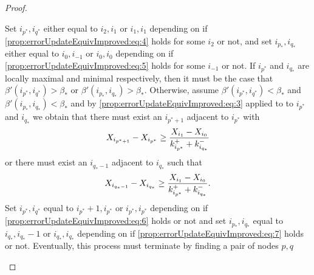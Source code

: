 \documentclass{article}
\theoremstyle{remark}
\begin{document}
\begin{proof}
\begin{enumerate}
			Set $i_{p^*},i_{q^*}$ either equal to $i_2,i_1$ or $i_1,i_1$ depending on if \eqref{prop:errorUpdateEquivImproved:eq:4} holds for some $i_2$ or not, and set $i_{p_*},i_{q_*}$ either equal to $i_0,i_{-1}$ or $i_0,i_0$ depending on if \eqref{prop:errorUpdateEquivImproved:eq:5} holds for some $i_{-1}$ or not. If $i_{p^*}$ and $i_{q_*}$ are locally maximal and minimal respectively, then it must be the case that $\beta'(i_{p^*},i_{q^*})>\beta_*$ or $\beta'(i_{p_*},i_{q_*})>\beta_*$.  Otherwise, assume $\beta'(i_{p^*},i_{q^*})<\beta_*$ and $\beta'(i_{p_*},i_{q_*})<\beta_*$ and by \eqref{prop:errorUpdateEquivImproved:eq:3} applied to to $i_{p^*}$ and $i_{q_*}$ we obtain that there must exist an $i_{p^*+1}$ adjacent to $i_{p^*}$ with
			\begin{equation}{\label{prop:errorUpdateEquivImproved:eq:6}}
				X_{i_{p^*+1}}-X_{i_{p^*}}\geq\frac{X_{i_1}-X_{i_0}}{k^+_{i_{p^*}}+k^-_{i_{q_*}}}
			\end{equation}
			or there must exist an $i_{q_*-1}$ adjacent to $i_{q_*}$ such that
			\begin{equation}{\label{prop:errorUpdateEquivImproved:eq:7}}
				X_{i_{q_*-1}}-X_{i_{q_*}}\geq\frac{X_{i_1}-X_{i_0}}{k^+_{i_{p^*}}+k^-_{i_{q_*}}}.
			\end{equation}
			Set $i_{p^*},i_{q^*}$ equal to $i_{p^*}+1,i_{p^*}$ or $i_{p^*},i_{p^*}$ depending on if \eqref{prop:errorUpdateEquivImproved:eq:6} holds or not and set $i_{p_*},i_{q_*}$ equal to $i_{q_*},i_{q_*}-1$ or $i_{q_*},i_{q_*}$ depending on if \eqref{prop:errorUpdateEquivImproved:eq:7} holds or not. Eventually, this process must terminate by finding a pair of nodes $p,q$ 
			

\end{enumerate}
\end{proof}
\end{document}
